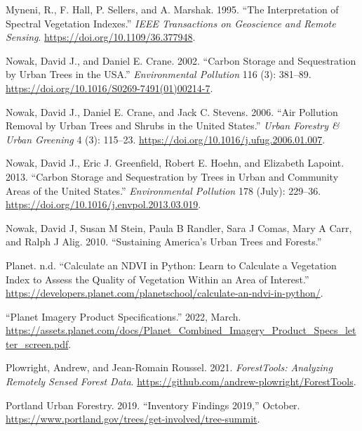 \documentclass[12pt,twoside]{reedthesis}
\newlength{\cslhangindent}
\newenvironment{CSLReferences}[2] %
 {%
  \setlength{\parindent}{0pt}
  \ifodd #1 \everypar{\setlength{\hangindent}{\cslhangindent}}\ignorespaces\fi
  \ifnum #2 > 0
  \setlength{\parskip}{#2\baselineskip}
  \fi
 }%
 {}
\begin{document}
\begin{CSLReferences}{1}{0}
\leavevmode{}%
Myneni, R., F. Hall, P. Sellers, and A. Marshak. 1995. {``The Interpretation of Spectral Vegetation Indexes.''} \emph{IEEE Transactions on Geoscience and Remote Sensing}. \url{https://doi.org/10.1109/36.377948}.

\leavevmode{}%
Nowak, David J., and Daniel E. Crane. 2002. {``Carbon Storage and Sequestration by Urban Trees in the USA.''} \emph{Environmental Pollution} 116 (3): 381--89. \url{https://doi.org/10.1016/S0269-7491(01)00214-7}.

\leavevmode{}%
Nowak, David J., Daniel E. Crane, and Jack C. Stevens. 2006. {``Air Pollution Removal by Urban Trees and Shrubs in the United States.''} \emph{Urban Forestry \& Urban Greening} 4 (3): 115--23. \url{https://doi.org/10.1016/j.ufug.2006.01.007}.

\leavevmode{}%
Nowak, David J., Eric J. Greenfield, Robert E. Hoehn, and Elizabeth Lapoint. 2013. {``Carbon Storage and Sequestration by Trees in Urban and Community Areas of the United States.''} \emph{Environmental Pollution} 178 (July): 229--36. \url{https://doi.org/10.1016/j.envpol.2013.03.019}.

\leavevmode{}%
Nowak, David J, Susan M Stein, Paula B Randler, Sara J Comas, Mary A Carr, and Ralph J Alig. 2010. {``Sustaining America{'}s Urban Trees and Forests.''}

\leavevmode{}%
Planet. n.d. {``Calculate an NDVI in Python: Learn to Calculate a Vegetation Index to Assess the Quality of Vegetation Within an Area of Interest.''} \url{https://developers.planet.com/planetschool/calculate-an-ndvi-in-python/}.

\leavevmode{}%
{``Planet Imagery Product Specifications.''} 2022, March. \url{https://assets.planet.com/docs/Planet_Combined_Imagery_Product_Specs_letter_screen.pdf}.

\leavevmode{}%
Plowright, Andrew, and Jean-Romain Roussel. 2021. \emph{ForestTools: Analyzing Remotely Sensed Forest Data}. \url{https://github.com/andrew-plowright/ForestTools}.

\leavevmode{}%
Portland Urban Forestry. 2019. {``Inventory Findings 2019,''} October. \url{https://www.portland.gov/trees/get-involved/tree-summit}.


\end{CSLReferences}
\end{document}
